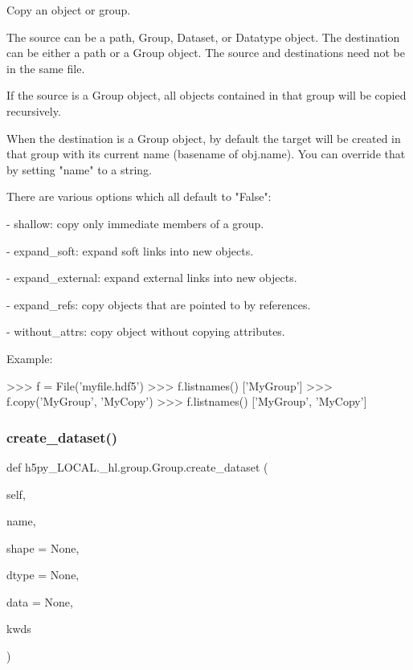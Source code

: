 \begin{DoxyVerb}Copy an object or group.

The source can be a path, Group, Dataset, or Datatype object.  The
destination can be either a path or a Group object.  The source and
destinations need not be in the same file.

If the source is a Group object, all objects contained in that group
will be copied recursively.

When the destination is a Group object, by default the target will
be created in that group with its current name (basename of obj.name).
You can override that by setting "name" to a string.

There are various options which all default to "False":

 - shallow: copy only immediate members of a group.

 - expand_soft: expand soft links into new objects.

 - expand_external: expand external links into new objects.

 - expand_refs: copy objects that are pointed to by references.

 - without_attrs: copy object without copying attributes.

       Example:

>>> f = File('myfile.hdf5')
>>> f.listnames()
['MyGroup']
>>> f.copy('MyGroup', 'MyCopy')
>>> f.listnames()
['MyGroup', 'MyCopy']\end{DoxyVerb}
 \mbox{\label{classh5py__LOCAL_1_1__hl_1_1group_1_1Group_a6b006b0fe66c9e1748304929cd60bdd2}} 
\subsubsection{\texorpdfstring{create\+\_\+dataset()}{create\_dataset()}}
{\footnotesize\ttfamily def h5py\+\_\+\+L\+O\+C\+A\+L.\+\_\+hl.\+group.\+Group.\+create\+\_\+dataset (\begin{DoxyParamCaption}\item[{}]{self,  }\item[{}]{name,  }\item[{}]{shape = {\ttfamily None},  }\item[{}]{dtype = {\ttfamily None},  }\item[{}]{data = {\ttfamily None},  }\item[{}]{kwds }\end{DoxyParamCaption})}

